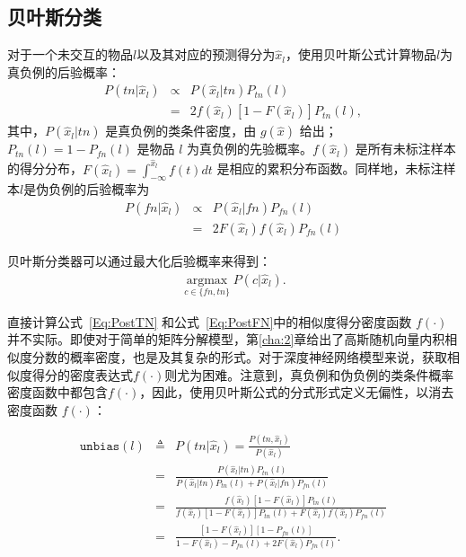 \subsection{贝叶斯分类}
对于一个未交互的物品$l$以及其对应的预测得分为$\hat{x}_l$，使用贝叶斯公式计算物品$l$为真负例的后验概率：
\begin{eqnarray} \label{Eq:PostTN}
	P(tn|\hat{x}_l) &\propto& P(\hat{x}_l|tn) P_{tn}(l) \nonumber \\
	&=&  2f(\hat{x}_l) [1 - F(\hat{x}_l)] P_{tn}(l),
\end{eqnarray}
其中，$P(\hat{x}_l|tn)$ 是真负例的类条件密度，由 $g(\hat{x})$ 给出；$P_{tn}(l) = 1 - P_{fn}(l)$ 是物品 $l$ 为真负例的先验概率。$f(\hat{x}_l)$ 是所有未标注样本的得分分布，$F(\hat{x}_l) = \int_{-\infty}^{\hat{x}_l} f(t) dt$ 是相应的累积分布函数。同样地，未标注样本$l$是伪负例的后验概率为
\begin{eqnarray}\label{Eq:PostFN}
	P(fn|\hat{x}_l) &\propto& P(\hat{x}_l|fn) P_{fn}(l) \nonumber \\
	&=& 2 F(\hat{x}_l) f(\hat{x}_l) P_{fn}(l)
\end{eqnarray}

贝叶斯分类器可以通过最大化后验概率来得到：
\begin{eqnarray}
	\mathop{\arg\max}\limits_{c \in \{fn, tn\}} P(c|\hat{x}_l).
\end{eqnarray}

直接计算公式~\eqref{Eq:PostTN} 和公式~\eqref{Eq:PostFN}中的相似度得分密度函数 $f(\cdot)$ 并不实际。即使对于简单的矩阵分解模型，第\ref{cha:2}章给出了高斯随机向量内积相似度分数的概率密度，也是及其复杂的形式。对于深度神经网络模型来说，获取相似度得分的密度表达式$f(\cdot)$则尤为困难。注意到，真负例和伪负例的类条件概率密度函数中都包含$f(\cdot)$，因此，使用贝叶斯公式的分式形式定义无偏性，以消去密度函数 $f(\cdot)$：

\begin{eqnarray}
	\mathtt{unbias}(l) &\triangleq&  P(tn|\hat{x}_l) = \frac{P(tn,\hat{x}_l)}{P(\hat{x}_l)} \label{Eq:NorPost} \\
	&=& \frac{P(\hat{x}_l |tn)P_{tn}(l)}{P(\hat{x}_l |tn)P_{tn}(l)+P(\hat{x}_l |fn)P_{fn}(l)} \\
	&=& \frac{ f(\hat{x}_l) [1 - F(\hat{x}_l)] P_{tn}(l)}{ f(\hat{x}_l) [1 - F(\hat{x}_l)] P_{tn}(l) + F(\hat{x}_l) f(\hat{x}_l) P_{fn}(l) }  \nonumber\\
	&=&  \frac{  [1 - F(\hat{x}_l)][1-P_{fn}(l)] }{1 - F(\hat{x}_l) -P_{fn}(l) + 2F(\hat{x}_l)P_{fn}(l) }.\label{Eq:unbias}
\end{eqnarray}

